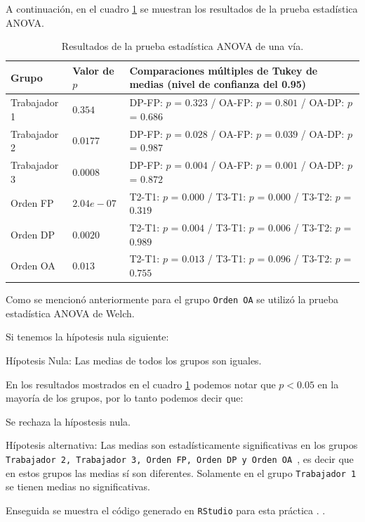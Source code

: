 \documentclass{article}
\begin{document}
A continuación, en el cuadro \ref{Cuadro 4} se muestran los resultados de la prueba estadística ANOVA.

\begin{table}[ht]
\centering
\caption{Resultados de la prueba estadística ANOVA de una vía.}
\smallskip

 \begin{tabular}{ |p{2.2cm}|p{1.8cm}|p{11.5cm}|}
 \hline
 Grupo & Valor de $p$ & Comparaciones múltiples de Tukey de medias (nivel de confianza del 0.95)\\
 \hline
 Trabajador 1  & $0.354$ & DP-FP: $p$ = $0.323$ / OA-FP: $p$ = $0.801$ / OA-DP: $p$ = $0.686$\\
 \hline
 Trabajador 2 & $0.0177$ & DP-FP: $p$ = $0.028$ / OA-FP: $p$ = $0.039$ / OA-DP: $p$ = $0.987$\\
 \hline
 Trabajador 3 & $0.0008$ & DP-FP: $p$ = $0.004$ / OA-FP: $p$ = $0.001$ / OA-DP: $p$ = $0.872$\\
 \hline
 Orden FP & $2.04e-07$  & T2-T1: $p$ = $0.000$ / T3-T1: $p$ = $0.000$ / T3-T2: $p$ = $0.319$ \\
 \hline
 Orden DP & $0.0020$ & T2-T1: $p$ = $0.004$ / T3-T1: $p$ = $0.006$ / T3-T2: $p$ = $0.989$  \\
 \hline
 Orden OA & $0.013$ & T2-T1: $p$ = $0.013$ / T3-T1: $p$ = $0.096$ / T3-T2: $p$ = $0.755$  \\
 \hline
\end{tabular}
\label{Cuadro 4}
\end{table}

Como se mencionó anteriormente para el grupo \texttt{Orden OA} se utilizó la prueba estadística ANOVA de Welch. 
\smallskip

Si tenemos la hípotesis nula siguiente: 
\smallskip

Hípotesis Nula: Las medias de todos los grupos son iguales.
\bigskip

En los resultados mostrados en el cuadro \ref{Cuadro 4} podemos notar que $p < 0.05$ en la mayoría de los grupos, por lo tanto podemos decir que:
\smallskip

Se rechaza la hípostesis nula.

Hípotesis alternativa: Las medias son estadísticamente significativas en los grupos \texttt{Trabajador 2, Trabajador 3, Orden FP, Orden DP y Orden OA },  es decir que en estos grupos las medias sí son diferentes. Solamente en el grupo \texttt{Trabajador 1} se tienen medias no significativas. 
\bigskip

Enseguida se muestra el código generado en \texttt{RStudio} para esta práctica \citep{6}.
\newpage
.
\bigskip
\end{document}
